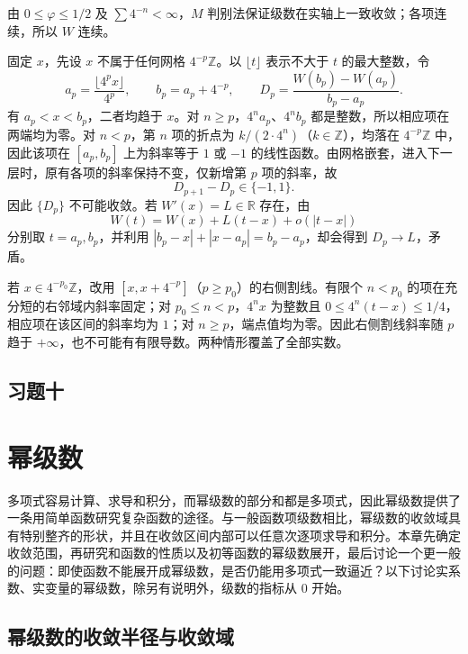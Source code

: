 \documentclass[UTF8,12pt,a4paper,fontset=fandol]{ctexbook}
\begin{document}
\begin{solve}
由 $0\leq\varphi\leq1/2$ 及 $\sum4^{-n}<\infty$，$M$ 判别法保证级数在实轴上一致收敛；各项连续，所以 $W$ 连续。

固定 $x$，先设 $x$ 不属于任何网格 $4^{-p}\mathbb Z$。以 $\lfloor t\rfloor$ 表示不大于 $t$ 的最大整数，令
\[
    a_p=\frac{\lfloor4^px\rfloor}{4^p},\qquad b_p=a_p+4^{-p},
    \qquad D_p=\frac{W(b_p)-W(a_p)}{b_p-a_p}.
\]
有 $a_p<x<b_p$，二者均趋于 $x$。对 $n\geq p$，$4^na_p$、$4^nb_p$ 都是整数，所以相应项在两端均为零。对 $n<p$，第 $n$ 项的折点为 $k/(2\cdot4^n)$（$k\in\mathbb Z$），均落在 $4^{-p}\mathbb Z$ 中，因此该项在 $[a_p,b_p]$ 上为斜率等于 $1$ 或 $-1$ 的线性函数。由网格嵌套，进入下一层时，原有各项的斜率保持不变，仅新增第 $p$ 项的斜率，故
\[
    D_{p+1}-D_p\in\{-1,1\}.
\]
因此 $\{D_p\}$ 不可能收敛。若 $W'(x)=L\in\mathbb R$ 存在，由
\[
    W(t)=W(x)+L(t-x)+o(|t-x|)
\]
分别取 $t=a_p,b_p$，并利用 $|b_p-x|+|x-a_p|=b_p-a_p$，却会得到 $D_p\to L$，矛盾。

若 $x\in4^{-p_0}\mathbb Z$，改用 $[x,x+4^{-p}]$（$p\geq p_0$）的右侧割线。有限个 $n<p_0$ 的项在充分短的右邻域内斜率固定；对 $p_0\leq n<p$，$4^nx$ 为整数且 $0\leq4^n(t-x)\leq1/4$，相应项在该区间的斜率均为 $1$；对 $n\geq p$，端点值均为零。因此右侧割线斜率随 $p$ 趋于 $+\infty$，也不可能有有限导数。两种情形覆盖了全部实数。
\end{solve}

\section*{习题十}

\chapter{幂级数}
\label{chap:power-series}

多项式容易计算、求导和积分，而幂级数的部分和都是多项式，因此幂级数提供了一条用简单函数研究复杂函数的途径。与一般函数项级数相比，幂级数的收敛域具有特别整齐的形状，并且在收敛区间内部可以任意次逐项求导和积分。本章先确定收敛范围，再研究和函数的性质以及初等函数的幂级数展开，最后讨论一个更一般的问题：即使函数不能展开成幂级数，是否仍能用多项式一致逼近？以下讨论实系数、实变量的幂级数，除另有说明外，级数的指标从 $0$ 开始。

\section{幂级数的收敛半径与收敛域}
\label{sec:radius-and-domain-of-convergence}
\end{document}
